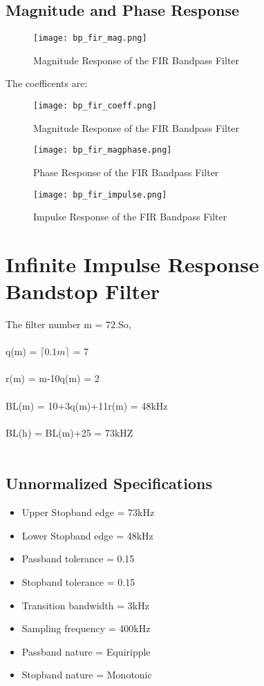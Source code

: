 \documentclass[12pt]{article}
\begin{document}
\subsection{\textbf{Magnitude and Phase Response}}

\begin{figure}[H]
\centering
\texttt{[image: bp\_fir\_mag.png]}
\caption{Magnitude Response of the FIR Bandpass Filter}
\label{fig:mesh2}
\end{figure}
\newpage
The coefficents are:
\begin{figure}[H]
\centering
\texttt{[image: bp\_fir\_coeff.png]}
\caption{Magnitude Response of the FIR Bandpass Filter}
\label{fig:mesh2}
\end{figure}
\begin{figure}[h]
\centering
\texttt{[image: bp\_fir\_magphase.png]}
\caption{Phase Response of the FIR Bandpass Filter}
\label{fig:mesh2}
\end{figure}

\begin{figure}[H]
\centering
\texttt{[image: bp\_fir\_impulse.png]}
\caption{Impulse Response of the FIR Bandpass Filter}
\label{fig:mesh2}
\end{figure}
\newline
\newpage
\section{Infinite Impulse Response Bandstop Filter}
The filter number m = 72.So,\\\\
q(m) = $\lceil 0.1m \rceil$ = 7\\\\
r(m) = m-10q(m) = 2\\\\
BL(m) =  10+3q(m)+11r(m) = 48kHz\\\\
BL(h) = BL(m)+25 = 73kHZ\\ \\

\subsection{\textbf{Unnormalized Specifications}}
\begin{itemize}
    \item Upper Stopband edge = 73kHz
    \item Lower Stopband edge = 48kHz
    \item Passband tolerance = 0.15
    \item Stopband tolerance = 0.15
    \item Transition bandwidth = 3kHz
    \item Sampling frequency = 400kHz
    \item Passband nature = Equiripple
    \item Stopband nature = Monotonic
\end{itemize}
\end{document}
